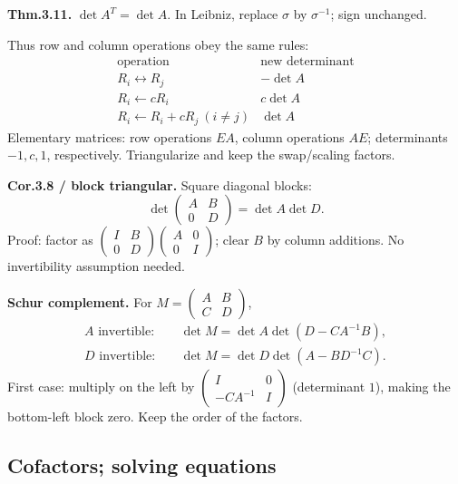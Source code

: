 \documentclass[11pt,letterpaper]{article}
\begin{document}
\textbf{Thm.3.11.} \(\det A^T=\det A\). In Leibniz, replace \(\sigma\)
by \(\sigma^{-1}\); sign unchanged.

Thus row and column operations obey the same rules: \[
\begin{array}{c|c}
\text{operation}&\text{new determinant}\\\hline
R_i\leftrightarrow R_j&-\det A\\
R_i\leftarrow cR_i&c\det A\\
R_i\leftarrow R_i+cR_j\ (i\ne j)&\det A
\end{array}
\] Elementary matrices: row operations \(EA\), column operations \(AE\);
determinants \(-1,c,1\), respectively. Triangularize and keep the
swap/scaling factors.

\textbf{Cor.3.8 / block triangular.} Square diagonal blocks: \[
\det\begin{pmatrix}A&B\\0&D\end{pmatrix}=\det A\det D.
\] Proof: factor as
\(\begin{pmatrix}I&B\\0&D\end{pmatrix}\begin{pmatrix}A&0\\0&I\end{pmatrix}\);
clear \(B\) by column additions. No invertibility assumption needed.

\textbf{Schur complement.} For
\(M=\begin{pmatrix}A&B\\C&D\end{pmatrix}\), \[
\begin{aligned}
A\text{ invertible}:\quad&\det M=\det A\det(D-CA^{-1}B),\\
D\text{ invertible}:\quad&\det M=\det D\det(A-BD^{-1}C).
\end{aligned}
\] First case: multiply on the left by
\(\begin{pmatrix}I&0\\-CA^{-1}&I\end{pmatrix}\) (determinant \(1\)),
making the bottom-left block zero. Keep the order of the factors.

\newpage

\subsection{Cofactors; solving
equations}\label{cofactors-solving-equations}
\end{document}
